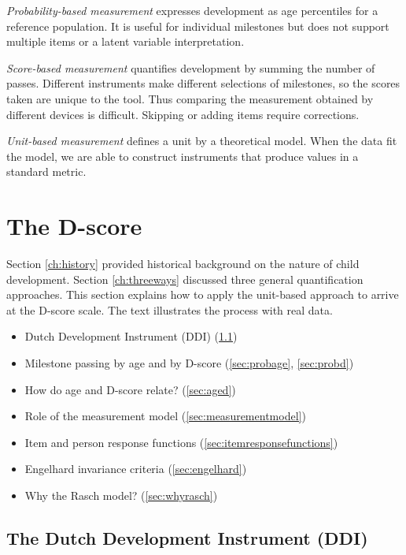\documentclass[
]{book}
\providecommand{\tightlist}{%
  \setlength{\itemsep}{0pt}\setlength{\parskip}{0pt}}
\begin{document}
\emph{Probability-based measurement} expresses development as age percentiles for a reference population. It is useful for individual milestones but does not support multiple items or a latent variable interpretation.

\emph{Score-based measurement} quantifies development by summing the number of passes. Different instruments make different selections of milestones, so the scores taken are unique to the tool. Thus comparing the measurement obtained by different devices is difficult. Skipping or adding items require corrections.

\emph{Unit-based measurement} defines a unit by a theoretical model. When the data fit the model, we are able to construct instruments that produce values in a standard metric.

\hypertarget{ch:newmodel}{%
\chapter{The D-score}\label{ch:newmodel}}

Section \ref{ch:history} provided historical background on the nature of child development. Section \ref{ch:threeways} discussed three general quantification approaches. This section explains how to apply the unit-based approach to arrive at the D-score scale. The text illustrates the process with real data.

\begin{itemize}
\tightlist
\item
  Dutch Development Instrument (DDI) (\ref{sec:ddi})
\item
  Milestone passing by age and by D-score (\ref{sec:probage}, \ref{sec:probd})
\item
  How do age and D-score relate? (\ref{sec:aged})
\item
  Role of the measurement model (\ref{sec:measurementmodel})
\item
  Item and person response functions (\ref{sec:itemresponsefunctions})
\item
  Engelhard invariance criteria (\ref{sec:engelhard})
\item
  Why the Rasch model? (\ref{sec:whyrasch})
\end{itemize}

\hypertarget{sec:ddi}{%
\section{The Dutch Development Instrument (DDI)}\label{sec:ddi}}
\end{document}
